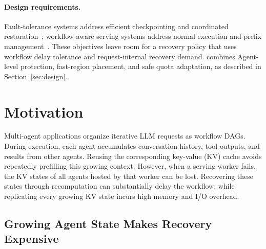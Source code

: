 \paragraph{Design requirements.}
Fault-tolerance systems address efficient checkpointing and coordinated restoration~\cite{strati2024dejavu,cao2026lumen,jayakody2026ghostserve}; workflow-aware serving systems address normal execution and prefix management~\cite{lin2024parrot,pan2025kvflow,ni2026topas}. These objectives leave room for a recovery policy that uses workflow delay tolerance and request-internal recovery demand. \system combines Agent-level protection, fast-region placement, and safe quota adaptation, as described in Section~\ref{sec:design}.

\iffalse
\section{Motivation} \label{sec:motivation} 

Multi-agent applications organize iterative LLM requests as workflow DAGs. During execution, each agent accumulates conversation history, tool outputs, and results from other agents. Reusing the corresponding key-value (KV) cache avoids repeatedly prefilling this growing context. However, when a serving worker fails, the KV states of all agents hosted by that worker can be lost. Recovering these states through recomputation can substantially delay the workflow, while replicating every growing KV state incurs high memory and I/O overhead. 





\subsection{Growing Agent State Makes Recovery Expensive} \label{sec:motivation:growth} 


